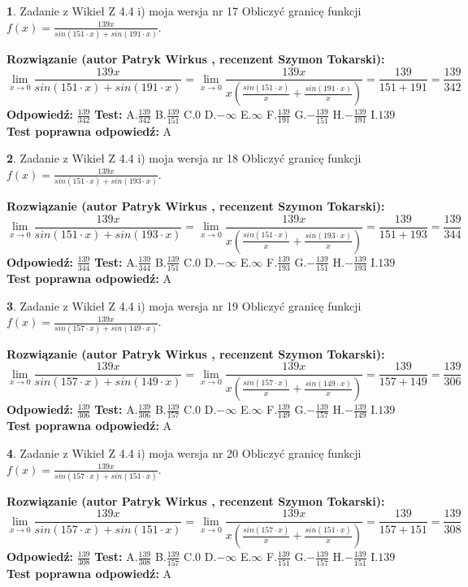 \documentclass[12pt, a4paper]{article}
\theoremstyle{definition} %
\newtheorem{zad}{}
\newcommand{\zadStart}[1]{\begin{zad}#1\newline}
\newcommand{\zadStop}{\end{zad}}
\newcommand{\rozwStart}[2]{\noindent \textbf{Rozwiązanie (autor #1 , recenzent #2): }\newline}
\newcommand{\rozwStop}{\newline}
\newcommand{\odpStart}{\noindent \textbf{Odpowiedź:}\newline}
\newcommand{\odpStop}{\newline}
\newcommand{\testStart}{\noindent \textbf{Test:}\newline}
\newcommand{\testStop}{\newline}
\newcommand{\kluczStart}{\noindent \textbf{Test poprawna odpowiedź:}\newline}
\newcommand{\kluczStop}{\newline}
\begin{document}
\zadStart{Zadanie z Wikieł Z 4.4 i) moja wersja nr 17}
Obliczyć granicę funkcji $f(x)=\frac{139x}{sin(151\cdot x) +sin(191\cdot x)}$.
\zadStop
\rozwStart{Patryk Wirkus}{Szymon Tokarski}
$$\lim\limits_{x\to 0}\frac{139x}{sin(151\cdot x) +sin(191\cdot x)}=\lim\limits_{x\to 0}\frac{139x}{x(\frac{sin(151\cdot x)}{x}+\frac{sin(191\cdot x)}{x})}=\frac{139}{151+191} = \frac{139}{342}$$
\rozwStop
\odpStart
$\frac{139}{342}$
\odpStop
\testStart
A.$\frac{139}{342}$
B.$\frac{139}{151}$
C.$0$
D.$-\infty$
E.$\infty$
F.$\frac{139}{191}$
G.$-\frac{139}{151}$
H.$-\frac{139}{191}$
I.$139$
\testStop
\kluczStart
A
\kluczStop



\zadStart{Zadanie z Wikieł Z 4.4 i) moja wersja nr 18}
Obliczyć granicę funkcji $f(x)=\frac{139x}{sin(151\cdot x) +sin(193\cdot x)}$.
\zadStop
\rozwStart{Patryk Wirkus}{Szymon Tokarski}
$$\lim\limits_{x\to 0}\frac{139x}{sin(151\cdot x) +sin(193\cdot x)}=\lim\limits_{x\to 0}\frac{139x}{x(\frac{sin(151\cdot x)}{x}+\frac{sin(193\cdot x)}{x})}=\frac{139}{151+193} = \frac{139}{344}$$
\rozwStop
\odpStart
$\frac{139}{344}$
\odpStop
\testStart
A.$\frac{139}{344}$
B.$\frac{139}{151}$
C.$0$
D.$-\infty$
E.$\infty$
F.$\frac{139}{193}$
G.$-\frac{139}{151}$
H.$-\frac{139}{193}$
I.$139$
\testStop
\kluczStart
A
\kluczStop



\zadStart{Zadanie z Wikieł Z 4.4 i) moja wersja nr 19}
Obliczyć granicę funkcji $f(x)=\frac{139x}{sin(157\cdot x) +sin(149\cdot x)}$.
\zadStop
\rozwStart{Patryk Wirkus}{Szymon Tokarski}
$$\lim\limits_{x\to 0}\frac{139x}{sin(157\cdot x) +sin(149\cdot x)}=\lim\limits_{x\to 0}\frac{139x}{x(\frac{sin(157\cdot x)}{x}+\frac{sin(149\cdot x)}{x})}=\frac{139}{157+149} = \frac{139}{306}$$
\rozwStop
\odpStart
$\frac{139}{306}$
\odpStop
\testStart
A.$\frac{139}{306}$
B.$\frac{139}{157}$
C.$0$
D.$-\infty$
E.$\infty$
F.$\frac{139}{149}$
G.$-\frac{139}{157}$
H.$-\frac{139}{149}$
I.$139$
\testStop
\kluczStart
A
\kluczStop



\zadStart{Zadanie z Wikieł Z 4.4 i) moja wersja nr 20}
Obliczyć granicę funkcji $f(x)=\frac{139x}{sin(157\cdot x) +sin(151\cdot x)}$.
\zadStop
\rozwStart{Patryk Wirkus}{Szymon Tokarski}
$$\lim\limits_{x\to 0}\frac{139x}{sin(157\cdot x) +sin(151\cdot x)}=\lim\limits_{x\to 0}\frac{139x}{x(\frac{sin(157\cdot x)}{x}+\frac{sin(151\cdot x)}{x})}=\frac{139}{157+151} = \frac{139}{308}$$
\rozwStop
\odpStart
$\frac{139}{308}$
\odpStop
\testStart
A.$\frac{139}{308}$
B.$\frac{139}{157}$
C.$0$
D.$-\infty$
E.$\infty$
F.$\frac{139}{151}$
G.$-\frac{139}{157}$
H.$-\frac{139}{151}$
I.$139$
\testStop
\kluczStart
A
\kluczStop
\end{document}
